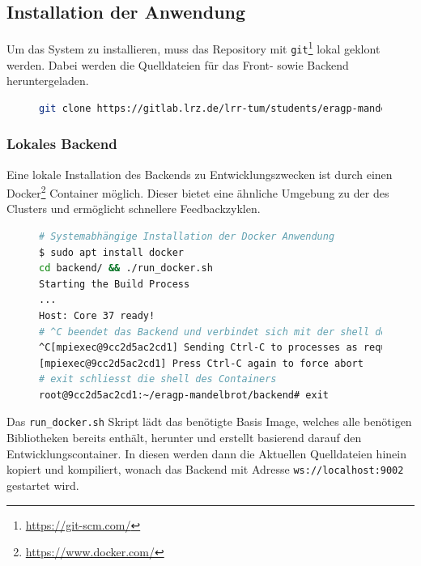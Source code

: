 \subsection{Installation der Anwendung}

Um das System zu installieren, muss das Repository mit \verb|git|\footnote{\url{https://git-scm.com/}} lokal geklont werden. Dabei werden die Quelldateien für
das Front- sowie Backend heruntergeladen.

\begin{figure}[h!]
	\begin{lstlisting}[language=bash, caption={Klonen des Repositorys}]
git clone https://gitlab.lrz.de/lrr-tum/students/eragp-mandelbrot.git
        \end{lstlisting}
\end{figure}

\subsubsection{Lokales Backend}
Eine lokale Installation des Backends zu Entwicklungszwecken ist durch einen Docker\footnote{\url{https://www.docker.com/}} Container möglich.
Dieser bietet eine ähnliche Umgebung zu der des Clusters und ermöglicht schnellere Feedbackzyklen.

\begin{figure}[h!]
	\begin{lstlisting}[language=bash, caption={Starten der Entwicklungsumbegung des Backends}]
# Systemabhängige Installation der Docker Anwendung
$ sudo apt install docker
cd backend/ && ./run_docker.sh
Starting the Build Process
...
Host: Core 37 ready!
# ^C beendet das Backend und verbindet sich mit der shell des Containers
^C[mpiexec@9cc2d5ac2cd1] Sending Ctrl-C to processes as requested
[mpiexec@9cc2d5ac2cd1] Press Ctrl-C again to force abort
# exit schliesst die shell des Containers
root@9cc2d5ac2cd1:~/eragp-mandelbrot/backend# exit
        \end{lstlisting}
\end{figure}

Das \verb|run_docker.sh| Skript lädt das benötigte Basis Image, welches alle benötigen Bibliotheken bereits enthält, herunter und erstellt basierend darauf
den Entwicklungscontainer. In diesen werden dann die Aktuellen Quelldateien hinein kopiert und kompiliert, wonach das Backend mit Adresse
\verb|ws://localhost:9002| gestartet wird.

